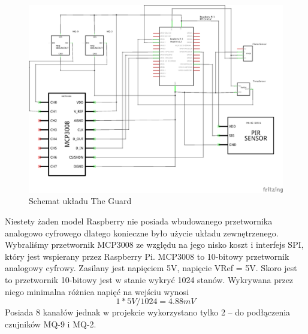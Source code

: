 \begin{figure}[h]
	\centering
	\includegraphics[width=15cm]{GuardSchem}
	\caption{Schemat układu The Guard}
\end{figure}

Niestety żaden model Raspberry nie posiada wbudowanego przetwornika analogowo cyfrowego dlatego konieczne było użycie układu zewnętrzenego. Wybraliśmy przetwornik MCP3008 ze względu na jego nisko koszt i interfejs SPI, który jest wspierany przez Raspberry Pi.
MCP3008 to 10-bitowy przetwornik analogowy cyfrowy. Zasilany jest napięciem 5V, napięcie VRef = 5V.  Skoro jest to przetwornik 10-bitowy jest w stanie wykryć 1024 stanów. Wykrywana przez niego minimalna różnica napięć na wejściu wynosi 
\begin{equation}
1 * 5V / 1024 = 4.88mV
\end{equation}
Posiada 8 kanałów jednak w projekcie wykorzystano tylko 2 – do podłączenia czujników MQ-9 i MQ-2.

